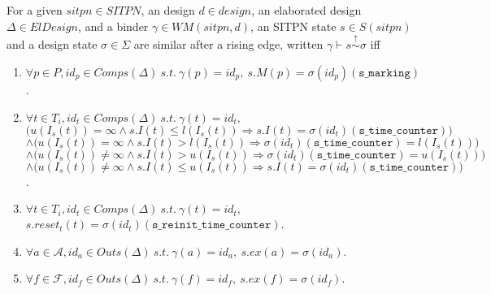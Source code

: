 \documentclass[dvipsnames,12pt]{article}
\begin{document}
\begin{definition}
  \label{def:post-re-state-sim}
  For a given $sitpn\in{}SITPN$, an \hvhdl{} design $d\in{}design$, an
  elaborated design $\Delta\in{}ElDesign$, and a binder
  $\gamma\in{}WM(sitpn,d)$, an SITPN state $s\in{}S(sitpn)$ and a
  design state $\sigma\in\Sigma$ are similar after a rising edge,
  written $\gamma\vdash{}s\stackrel{\uparrow}{\sim}\sigma$ iff
  \begin{enumerate}
  \item
    $\forall{}p\in{}P,id_p\in{}Comps(\Delta)~s.t.~\gamma(p)=id_p,~s.M(p)=\sigma(id_p)(\texttt{s\_marking})$.
  \item
    $\forall{}t\in{}T_i,id_t\in{}Comps(\Delta)~s.t.~\gamma(t)=id_t,$\\
    $\big(u(I_s(t))=\infty\land{}s.I(t)\le{}l(I_s(t))\Rightarrow{}s.I(t)=\sigma(id_t)(\texttt{s\_time\_counter})\big)$\\
    $\land\big(u(I_s(t))=\infty\land{}s.I(t)>{}l(I_s(t))\Rightarrow{}\sigma(id_t)(\texttt{s\_time\_counter})=l(I_s(t))\big)$\\
    $\land\big(u(I_s(t))\neq\infty\land{}s.I(t)>{}u(I_s(t))\Rightarrow{}\sigma(id_t)(\texttt{s\_time\_counter})=u(I_s(t))\big)$\\
    $\land\big(u(I_s(t))\neq\infty\land{}s.I(t)\le{}u(I_s(t))\Rightarrow{}s.I(t)=\sigma(id_t)(\texttt{s\_time\_counter})\big)$.
  \item
    $\forall{}t\in{}T_i,id_t\in{}Comps(\Delta)~s.t.~\gamma(t)=id_t,$
    $s.reset_t(t)=\sigma(id_t)(\texttt{s\_reinit\_time\_counter})$.
  \item
    $\forall{}a\in\mathcal{A},id_a\in{}Outs(\Delta)~s.t.~\gamma(a)=id_a,~s.ex(a)=\sigma(id_a)$.
  \item
    $\forall{}f\in\mathcal{F},id_f\in{}Outs(\Delta)~s.t.~\gamma(f)=id_f,~s.ex(f)=\sigma(id_f)$.
  \end{enumerate}
\end{definition}
\end{document}
